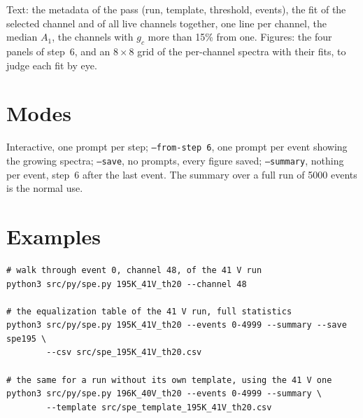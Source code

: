 \documentclass[11pt]{article}
\newcommand{\code}[1]{\texttt{#1}}
\begin{document}
Text: the metadata of the pass (run, template, threshold, events), the
fit of the selected channel and of all live channels together, one line
per channel, the median $A_1$, the channels with $g_c$ more than 15\% from
one. Figures: the four panels of step~6, and an $8\times8$ grid of the
per-channel spectra with their fits, to judge each fit by eye.

\section{Modes}

Interactive, one prompt per step; \code{--from-step 6}, one prompt per
event showing the growing spectra; \code{--save}, no prompts, every
figure saved; \code{--summary}, nothing per event, step~6 after the last
event. The summary over a full run of 5000 events is the normal use.

\section{Examples}

\begin{lstlisting}
# walk through event 0, channel 48, of the 41 V run
python3 src/py/spe.py 195K_41V_th20 --channel 48

# the equalization table of the 41 V run, full statistics
python3 src/py/spe.py 195K_41V_th20 --events 0-4999 --summary --save spe195 \
        --csv src/spe_195K_41V_th20.csv

# the same for a run without its own template, using the 41 V one
python3 src/py/spe.py 196K_40V_th20 --events 0-4999 --summary \
        --template src/spe_template_195K_41V_th20.csv
\end{lstlisting}
\end{document}
